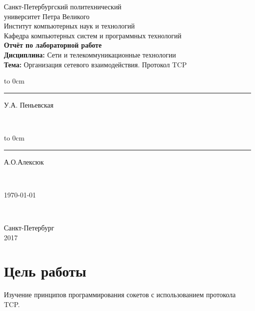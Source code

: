 \documentclass[a4paper,14pt]{article}
\begin{document}

\begin{titlepage}
	\newpage
	\begin{center} %
		Санкт-Петербургский политехнический\\ 
		университет Петра Великого\\
		Институт компьютерных наук и технологий\\
		Кафедра компьютерных систем и программных технологий\\
		\vspace{7cm}
		\textbf {Отчёт по лабораторной работе}\\
		\textbf {Дисциплина:} Сети и телекоммуникационные технологии\\
		\textbf{Тема:} Организация сетевого взаимодействия. Протокол TCP
	\end{center} %
	\vspace{8cm} %
	
	\vfill
	
	\hfill\parbox{9 cm}{\hspace*{3cm}\hbox to 0cm{\raisebox{-1em}{\small(подпись)}}\hspace*{-0.8cm}\rule{3cm}{0.8pt} У.А. Пеньевская}\\[0.6cm]
	
	 \hfill\parbox{9 cm}{\hspace*{3cm}\hbox to 0cm{\raisebox{-1em}{\small(подпись)}}\hspace*{-0.8cm}\rule{3cm}{0.8pt} А.О.Алексюк }\\[0.6cm]
	
	\hfill\parbox{9 cm}{\hspace*{5cm} \today }\\[0.6cm]

	\vspace{\fill}
	\begin{center}
		Санкт-Петербург \\ 2017	
	\end{center}
\end{titlepage}

\tableofcontents

\newpage

\setcounter {section}{0}
\setcounter {equation}{0}
\setcounter {figure}{0}
\section{Цель работы}
\hspace{0,5cm}   Изучение принципов программирования сокетов с использованием протокола TCP.
\end{document}
